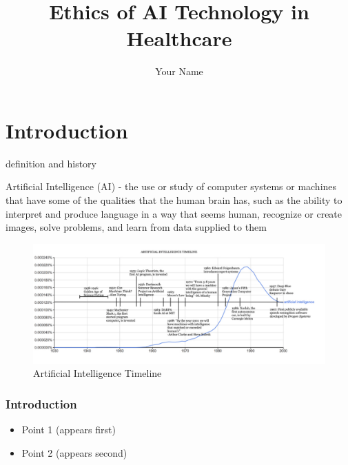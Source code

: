 \documentclass{beamer}
\title{Ethics of AI Technology in Healthcare}
\author{Your Name}
\institute{University of Exeter}
\date{}
\begin{document}
\begin{frame}
  \titlepage
\end{frame}



\section{Introduction}


\begin{frame}{definition and history}


\begin{block}{}
Artificial Intelligence (AI) - the use or study of computer systems or machines that have some of the qualities that the human brain has, such as the ability to interpret and produce language in a way that seems human, recognize or create images, solve problems, and learn from data supplied to them
\end{block}

\vfill %

\begin{figure}
  \includegraphics[width=\textwidth]{graph .PNG}
  \caption{Artificial Intelligence Timeline}
\end{figure}

\end{frame}

\begin{frame}
  \frametitle{Introduction}
  \begin{itemize}
    \item<1-> Point 1 (appears first)
    \item<2-> Point 2 (appears second)
  \end{itemize}
\end{frame}
\end{document}
